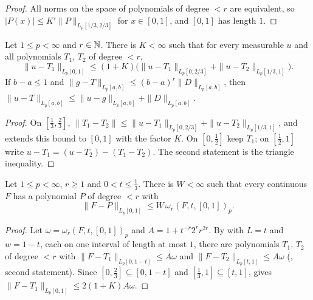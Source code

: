 \begin{proof}
\leanok
All norms on the space of polynomials of degree $< r$ are equivalent, so
$|P(x)| \leq K' \|P\|_{L_p[1/3,2/3]}$ for $x \in [0, 1]$, and $[0, 1]$ has length $1$.
\end{proof}

\begin{lemma}
\label{lem:poly-glue}
\leanok
{}
Let $1 \leq p < \infty$ and $r \in \mathbb{N}$. There is $K < \infty$ such that for every measurable $u$
and all polynomials $T_1$, $T_2$ of degree $< r$,
\[
  \|u - T_1\|_{L_p[0,1]}
  \leq (1 + K) \bigl( \|u - T_1\|_{L_p[0, 2/3]} + \|u - T_2\|_{L_p[1/3, 1]} \bigr) .
\]
If $b - a \leq 1$ and $\|g - T\|_{L_p[a,b]} \leq (b - a)^r \|D\|_{L_p[a,b]}$, then
$\|u - T\|_{L_p[a,b]} \leq \|u - g\|_{L_p[a,b]} + \|D\|_{L_p[a,b]}$.
\end{lemma}

\begin{proof}
\leanok
On $[\tfrac13, \tfrac23]$,
$\|T_1 - T_2\| \leq \|u - T_1\|_{L_p[0,2/3]} + \|u - T_2\|_{L_p[1/3,1]}$, and
 extends this bound to $[0, 1]$ with the factor $K$. On $[0, \tfrac12]$
keep $T_1$; on $[\tfrac12, 1]$ write $u - T_1 = (u - T_2) - (T_1 - T_2)$. The second statement is
the triangle inequality.
\end{proof}

\begin{theorem}
\label{thm:whitney}
\leanok
{}
Let $1 \leq p < \infty$, $r \geq 1$ and $0 < t \leq \tfrac13$. There is $W < \infty$ such that
every continuous $F$ has a polynomial $P$ of degree $< r$ with
\[
  \|F - P\|_{L_p[0, 1]} \leq W \, \omega_r(F, t, [0, 1])_p .
\]
\end{theorem}

\begin{proof}
\leanok
Let $\omega = \omega_r(F, t, [0,1])_p$ and $A = 1 + t^{-r} 2^r r^{2r}$. By
 with $L = t$ and $w = 1 - t$, each on one interval of length at
most $1$, there are polynomials $T_1$, $T_2$ of degree $< r$ with
$\|F - T_1\|_{L_p[0, 1-t]} \leq A \omega$ and $\|F - T_2\|_{L_p[t, 1]} \leq A \omega$
(, second statement). Since $[0, \tfrac23] \subseteq [0, 1 - t]$ and
$[\tfrac13, 1] \subseteq [t, 1]$,  gives
$\|F - T_1\|_{L_p[0,1]} \leq 2 (1 + K) A \omega$.
\end{proof}

